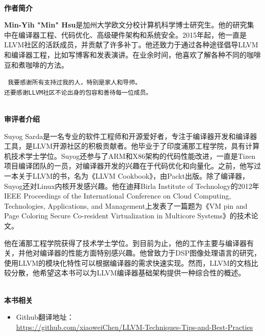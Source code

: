 \documentclass[11pt,a4paper,UTF8]{ctexart}
\begin{document}
	\hspace*{\fill} \\ %
	\noindent\textbf{作者简介}
	
	\textbf{Min-Yih "Min" Hsu}是加州大学欧文分校计算机科学博士研究生。他的研究集中在编译器工程、代码优化、高级硬件架构和系统安全。2015年起，他一直是LLVM社区的活跃成员，并贡献了许多补丁。他还致力于通过各种途径倡导LLVM和编译器工程，比如写博客和发表演讲。在业余时间，他喜欢了解各种不同的咖啡豆和煮咖啡的方法。
	\begin{center}
		\tt
		我要感谢所有支持过我的人，特别是家人和导师。\\还要感谢LLVM社区不论出身的包容和善待每一位成员。
	\end{center}

	\thispagestyle{empty}
	\hspace*{\fill} \\ %
	\noindent\textbf{审评者介绍}
	
	Suyog Sarda是一名专业的软件工程师和开源爱好者，专注于编译器开发和编译器工具，是LLVM开源社区的积极贡献者。他毕业于了印度浦那工程学院，具有计算机技术学士学位。Suyog还参与了ARM和X86架构的代码性能改进，一直是Tizen项目编译团队的一员，对编译器开发的兴趣在于代码优化和向量化。之前，他写过一本关于LLVM的书，名为《LLVM Cookbook》，由Packt出版。除了编译器，Suyog还对Linux内核开发感兴趣。他在迪拜Birla Institute of Technology的2012年IEEE Proceedings of the International Conference on Cloud Computing, Technologies, Applications, and Management上发表了一篇题为《VM pin and Page Coloring Secure Co-resident Virtualization in Multicore Systems》的技术论文。
	
	他在浦那工程学院获得了技术学士学位。到目前为止，他的工作主要与编译器有关，并他对编译器的性能方面特别感兴趣。他曾致力于DSP图像处理语言的研究，使用LLVM的模块化特性可以根据编译器的需求快速实现。然而，LLVM的文档比较分散，他希望这本书可以为LLVM编译器基础架构提供一种综合性的概述。
	
	
	\hspace*{\fill} \\ %
	\noindent\textbf{本书相关}
	\begin{itemize}
		\item Github翻译地址：\\\url{https://github.com/xiaoweiChen/LLVM-Techniques-Tips-and-Best-Practies}
	\end{itemize}
	\newpage
	
	\pagestyle{empty}
	
	\newpage
	
	\tableofcontents
	\newpage
	
\end{document}
